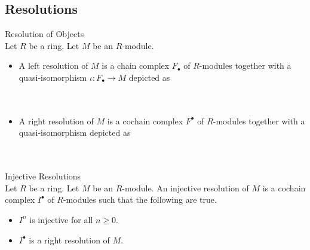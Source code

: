 \documentclass[a4paper]{article}
\begin{document}
\subsection{Resolutions}
\begin{defn}{Resolution of Objects}{}\\
Let $R$ be a ring. Let $M$ be an $R$-module. 
\begin{itemize}
\item A left resolution of $M$ is a chain complex $F_\bullet$ of $R$-modules together with a quasi-isomorphism $\iota:F_\bullet\to M$ depicted as \\~\\
\\
\item A right resolution of $M$ is a cochain complex $F^\bullet$ of $R$-modules together with a quasi-isomorphism depicted as \\~\\
\\
\end{itemize}
\end{defn}

\begin{defn}{Injective Resolutions}{}\\
Let $R$ be a ring. Let $M$ be an $R$-module. An injective resolution of $M$ is a cochain complex $I^\bullet$ of $R$-modules such that the following are true. 
\begin{itemize}
\item $I^n$ is injective for all $n\geq 0$. 
\item $I^\bullet$ is a right resolution of $M$. 
\end{itemize}
\end{defn}
\end{document}
